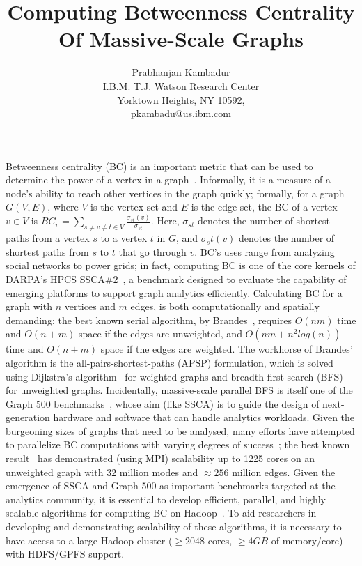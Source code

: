\documentclass{article}
\begin{document}
%
\title{Computing Betweenness Centrality Of Massive-Scale Graphs}

\author{
Prabhanjan Kambadur \\
I.B.M. T.J. Watson Research Center \\
Yorktown Heights, NY 10592, \\
pkambadu@us.ibm.com}
\date{}

\maketitle

Betweenness centrality (BC) is an important metric that can be used to
determine the power of a vertex in a graph~\cite{Freeman77,Anthonisse71}.
%
Informally, it is a measure of a node's ability to reach other vertices in 
the graph quickly; formally, for a graph $G(V,E)$, where $V$ is the vertex set
and $E$ is the edge set, the BC of a vertex $v\in{}V$ is $BC_{v} =
\sum_{s\ne{}v\ne{}t\in{}V}{\frac{\sigma{}_{st}(v)}{\sigma{}_{st}}}$.
%
Here, $\sigma{}_{st}$ denotes the number of shortest paths from a vertex $s$ to
a vertex $t$ in $G$, and $\sigma{}_st(v)$ denotes the number of shortest paths
from $s$ to $t$ that go through $v$.
%
BC's uses range from analyzing social networks to power grids; in fact,
computing BC is one of the core kernels of DARPA's HPCS
SSCA\#2~\cite{ssca_matlab}, a benchmark designed to evaluate the capability of
emerging platforms to support graph analytics efficiently.
%
Calculating BC for a graph with $n$ vertices and $m$ edges, is both
computationally and spatially demanding; the best known serial algorithm, by
Brandes~\cite{brandes01:_mathsoc}, requires $O(nm)$ time and $O(n+m)$ space if
the edges are unweighted, and $O(nm+n^2log(n))$ time and $O(n+m)$ space if the
edges are weighted.
%
The workhorse of Brandes' algorithm is the all-pairs-shortest-paths (APSP)
formulation, which is solved using Dijkstra's algorithm~\cite{dijkstra59} for
weighted graphs and breadth-first search (BFS)~\cite{clr90} for unweighted
graphs.
%
Incidentally, massive-scale parallel BFS is itself one of the Graph 500
benchmarks~\cite{graph500}, whose aim (like SSCA) is to guide the design of
next-generation hardware and software that can handle analytics workloads.
%
Given the burgeoning sizes of graphs that need to be analysed, many efforts
have attempted to parallelize BC computations with varying degrees of
success~\cite{Madduri:2009,Santos:2006,edmonds-hipc-2010,Yang05,buluc-2010};
the best known result~\cite{buluc-2010} has demonstrated (using MPI)
scalability up to 1225 cores on an unweighted graph with $32$ million modes and
$\approx{}256$ million edges.
%
Given the emergence of SSCA and Graph 500 as important benchmarks targeted at
the analytics community, it is essential to develop efficient, parallel, and 
highly scalable algorithms for computing BC on Hadoop~\cite{Hadoop}.
%
To aid researchers in developing and demonstrating scalability of these
algorithms, it is necessary to have access to a large Hadoop cluster
($\ge{}2048{}$ cores, $\ge{}4GB$ of memory/core) with HDFS/GPFS support.





\end{document}
